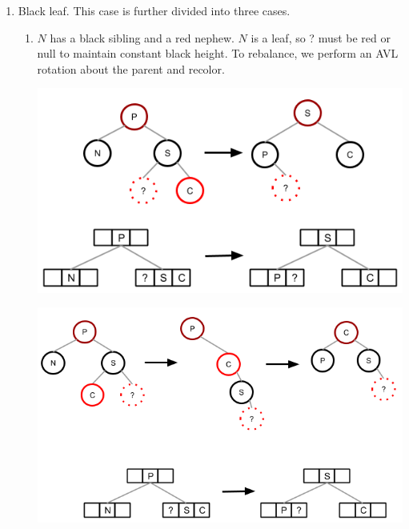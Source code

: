 \documentclass[12pt]{article}
\begin{document}
\begin{enumerate}
  \item Black leaf. This case is further divided into three cases.
  \begin{enumerate}
    \item \label{bleaf_bsib1} $N$ has a black sibling and a red nephew. $N$ is a leaf, so ? must be red or null to maintain constant black height. To rebalance, we perform an AVL rotation about the parent and recolor.
    \begin{center}
      \includegraphics[scale=0.65]{pics/red_black_tree/del_bleaf_bsib_rneph_rr}
    \end{center}
    \begin{center}
      \includegraphics[scale=0.55]{pics/red_black_tree/del_bleaf_bsib_rneph_rl}
    \end{center}


\end{enumerate}
\end{enumerate}
\end{document}
